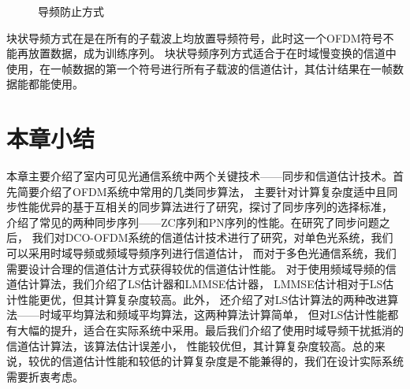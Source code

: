 \begin{figure}[htbp]
    \centering
    \caption{导频防止方式}
    \label{fig:PilotAllocation}
\end{figure}



块状导频方式在是在所有的子载波上均放置导频符号，此时这一个OFDM符号不能再放置数据，成为训练序列。
块状导频序列方式适合于在时域慢变换的信道中使用，在一帧数据的第一个符号进行所有子载波的信道估计，其估计结果在一帧数据能都能使用。



\section{本章小结}

本章主要介绍了室内可见光通信系统中两个关键技术——同步和信道估计技术。首先简要介绍了OFDM系统中常用的几类同步算法，
主要针对计算复杂度适中且同步性能优异的基于互相关的同步算法进行了研究，探讨了同步序列的选择标准，
介绍了常见的两种同步序列——ZC序列和PN序列的性能。在研究了同步问题之后，
我们对DCO-OFDM系统的信道估计技术进行了研究，对单色光系统，我们可以采用时域导频或频域导频序列进行信道估计，
而对于多色光通信系统，我们需要设计合理的信道估计方式获得较优的信道估计性能。
对于使用频域导频的信道估计算法，我们介绍了LS估计器和LMMSE估计器，
LMMSE估计相对于LS估计性能更优，但其计算复杂度较高。此外，
还介绍了对LS估计算法的两种改进算法——时域平均算法和频域平均算法，这两种算法计算简单，
但对LS估计性能都有大幅的提升，适合在实际系统中采用。最后我们介绍了使用时域导频干扰抵消的信道估计算法，该算法估计误差小，
性能较优但，其计算复杂度较高。总的来说，较优的信道估计性能和较低的计算复杂度是不能兼得的，我们在设计实际系统需要折衷考虑。


